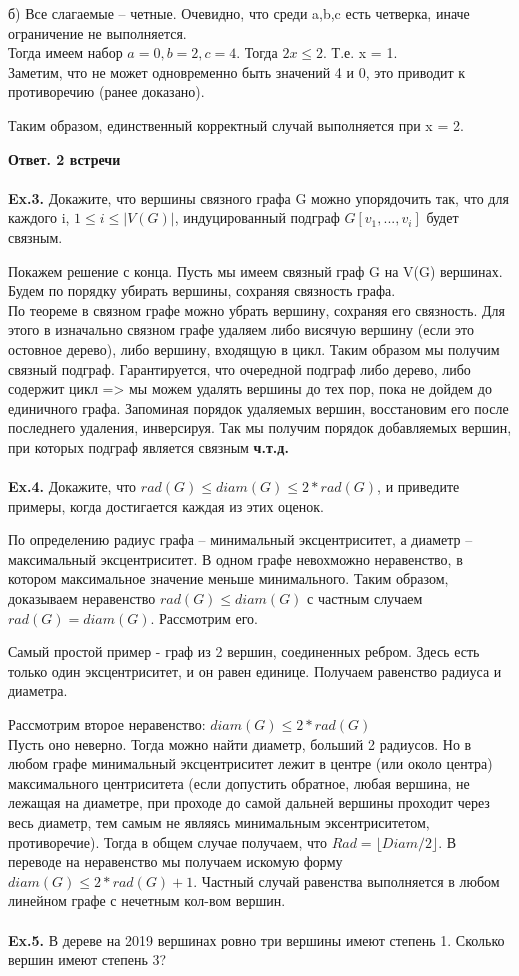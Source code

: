\documentclass[a4paper,12pt]{article}
\begin{document}
б) Все слагаемые -- четные. Очевидно, что среди a,b,c есть четверка, иначе ограничение не выполняется.
\\
Тогда имеем набор $ a = 0, b = 2, c = 4 $. Тогда $ 2x \leq 2 $. Т.е. x = 1.
\\
Заметим, что не может одновременно быть значений 4 и 0, это приводит к противоречию (ранее доказано).

Таким образом, единственный корректный случай выполняется при x = 2.

\textbf{Ответ. 2 встречи}
\\
\\
\textbf{Ex.3.} Докажите, что вершины связного графа G можно упорядочить так, что для каждого i, $ 1 \leq i \leq |V(G)| $, индуцированный подграф $ G[{v_1, ... , v_i}] $ будет связным.

Покажем решение с конца. Пусть мы имеем связный граф G  на V(G) вершинах. Будем по порядку убирать вершины, сохраняя связность графа.
\\
По теореме в связном графе можно убрать вершину, сохраняя его связность. Для этого в изначально связном графе удаляем либо висячую вершину (если это остовное дерево), либо вершину, входящую в цикл. Таким образом мы получим связный подграф. Гарантируется, что очередной подграф либо дерево, либо содержит цикл => мы можем удалять вершины до тех пор, пока не дойдем до единичного графа. Запоминая порядок удаляемых вершин, восстановим его после последнего удаления, инверсируя. Так мы получим порядок добавляемых вершин, при которых подграф является связным \textbf{ч.т.д.}
\\
\\
\textbf{Ex.4.} Докажите, что $ rad(G) \leq diam(G) \leq 2*rad(G) $, и приведите примеры, когда достигается каждая из этих оценок.

По определению радиус графа -- минимальный эксцентриситет, а диаметр -- максимальный эксцентриситет. В одном графе невохможно неравенство, в котором максимальное значение меньше минимального. Таким образом, доказываем неравенство $ rad(G) \leq diam(G) $ с частным случаем $ rad(G) = diam(G) $. Рассмотрим его.

Самый простой пример - граф из 2 вершин, соединенных ребром. Здесь есть только один эксцентриситет, и он равен единице. Получаем равенство радиуса и диаметра.


Рассмотрим второе неравенство: $ diam(G) \leq 2*rad(G) $
\\
Пусть оно неверно. Тогда можно найти диаметр, больший 2 радиусов. Но в любом графе минимальный эксцентриситет лежит в центре (или около центра) максимального центриситета (если допустить обратное, любая вершина, не лежащая на диаметре, при проходе до самой дальней вершины проходит через весь диаметр, тем самым не являясь минимальным эксентриситетом, противоречие). Тогда в общем случае получаем, что $ Rad = \lfloor Diam/2 \rfloor $. В переводе на неравенство мы получаем искомую форму $ diam(G) \leq 2*rad(G) + 1 $. Частный случай равенства выполняется в любом линейном графе с нечетным кол-вом вершин.
\\
\\
\textbf{Ex.5.} В дереве на 2019 вершинах ровно три вершины имеют степень 1. Сколько вершин имеют степень 3?
\end{document}
